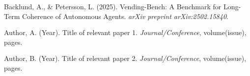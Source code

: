 \documentclass{article}
\begin{document}

\begin{thebibliography}{9}

Backlund, A., \& Petersson, L. (2025).
\newblock Vending-Bench: A Benchmark for Long-Term Coherence of Autonomous Agents.
\newblock \emph{arXiv preprint arXiv:2502.15840}.

Author, A. (Year).
\newblock Title of relevant paper 1.
\newblock \emph{Journal/Conference}, volume(issue), pages.

Author, B. (Year).
\newblock Title of relevant paper 2.
\newblock \emph{Journal/Conference}, volume(issue), pages.

\end{thebibliography}
\end{document}
